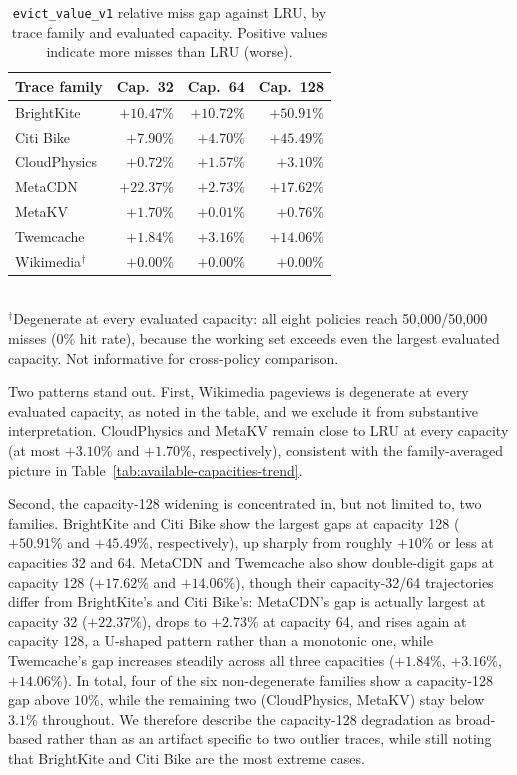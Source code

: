 \documentclass[preprint,12pt]{elsarticle}
\begin{document}
\begin{table}[!htbp]
\centering
\caption{\texttt{evict\_value\_v1} relative miss gap against LRU, by trace family and evaluated capacity. Positive values indicate more misses than LRU (worse).}
\label{tab:family-capacity-gap}
\small
\begin{tabular}{l r r r}
\toprule
Trace family & Cap.\ 32 & Cap.\ 64 & Cap.\ 128 \\
\midrule
BrightKite    & $+10.47\%$ & $+10.72\%$ & $+50.91\%$ \\
Citi Bike     & $+7.90\%$  & $+4.70\%$  & $+45.49\%$ \\
CloudPhysics  & $+0.72\%$  & $+1.57\%$  & $+3.10\%$ \\
MetaCDN       & $+22.37\%$ & $+2.73\%$  & $+17.62\%$ \\
MetaKV        & $+1.70\%$  & $+0.01\%$  & $+0.76\%$ \\
Twemcache     & $+1.84\%$  & $+3.16\%$  & $+14.06\%$ \\
Wikimedia$^\dagger$ & $+0.00\%$  & $+0.00\%$  & $+0.00\%$ \\
\bottomrule
\end{tabular}
\\[3pt]
\footnotesize $^\dagger$Degenerate at every evaluated capacity: all eight policies reach 50{,}000/50{,}000 misses (0\% hit rate), because the working set exceeds even the largest evaluated capacity. Not informative for cross-policy comparison.
\end{table}

Two patterns stand out. First, Wikimedia pageviews is degenerate at every evaluated capacity, as noted in the table, and we exclude it from substantive interpretation. CloudPhysics and MetaKV remain close to LRU at every capacity (at most $+3.10\%$ and $+1.70\%$, respectively), consistent with the family-averaged picture in Table~\ref{tab:available-capacities-trend}.

Second, the capacity-128 widening is concentrated in, but not limited to, two families. BrightKite and Citi Bike show the largest gaps at capacity 128 ($+50.91\%$ and $+45.49\%$, respectively), up sharply from roughly $+10\%$ or less at capacities 32 and 64. MetaCDN and Twemcache also show double-digit gaps at capacity 128 ($+17.62\%$ and $+14.06\%$), though their capacity-32/64 trajectories differ from BrightKite's and Citi Bike's: MetaCDN's gap is actually largest at capacity 32 ($+22.37\%$), drops to $+2.73\%$ at capacity 64, and rises again at capacity 128, a U-shaped pattern rather than a monotonic one, while Twemcache's gap increases steadily across all three capacities ($+1.84\%$, $+3.16\%$, $+14.06\%$). In total, four of the six non-degenerate families show a capacity-128 gap above $10\%$, while the remaining two (CloudPhysics, MetaKV) stay below $3.1\%$ throughout. We therefore describe the capacity-128 degradation as broad-based rather than as an artifact specific to two outlier traces, while still noting that BrightKite and Citi Bike are the most extreme cases.
\end{document}
